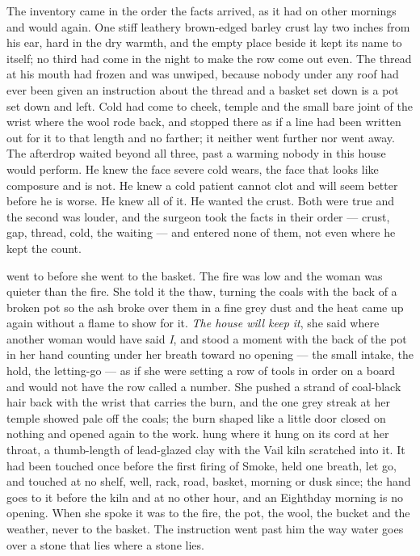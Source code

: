 The inventory came in the order the facts arrived, as it had on other mornings and would again. One stiff leathery brown-edged barley crust lay two inches from his ear, hard in the dry warmth, and the empty place beside it kept its name to itself; no third had come in the night to make the row come out even. The thread at his mouth had frozen and was unwiped, because nobody under any roof had ever been given an instruction about the thread and a basket set down is a pot set down and left. Cold had come to cheek, temple and the small bare joint of the wrist where the wool rode back, and stopped there as if a line had been written out for it to that length and no farther; it neither went further nor went away. The afterdrop waited beyond all three, past a warming nobody in this house would perform. He knew the face severe cold wears, the face that looks like composure and is not. He knew a cold patient cannot clot and will seem better before he is worse. He knew all of it. He wanted the crust. Both were true and the second was louder, and the surgeon took the facts in their order --- crust, gap, thread, cold, the waiting --- and entered none of them, not even where he kept the count.

\scenebreak

 went to  before she went to the basket. The fire was low and the woman was quieter than the fire. She told it the thaw, turning the coals with the back of a broken pot so the ash broke over them in a fine grey dust and the heat came up again without a flame to show for it. \emph{The house will keep it}, she said where another woman would have said \emph{I}, and stood a moment with the back of the pot in her hand counting under her breath toward no opening --- the small intake, the hold, the letting-go --- as if she were setting a row of tools in order on a board and would not have the row called a number. She pushed a strand of coal-black hair back with the wrist that carries the burn, and the one grey streak at her temple showed pale off the coals; the burn shaped like a little door closed on nothing and opened again to the work.  hung where it hung on its cord at her throat, a thumb-length of lead-glazed clay with the Vail kiln scratched into it. It had been touched once before the first firing of Smoke, held one breath, let go, and touched at no shelf, well, rack, road, basket, morning or dusk since; the hand goes to it before the kiln and at no other hour, and an Eighthday morning is no opening. When she spoke it was to the fire, the pot, the wool, the bucket and the weather, never to the basket. The instruction went past him the way water goes over a stone that lies where a stone lies.

